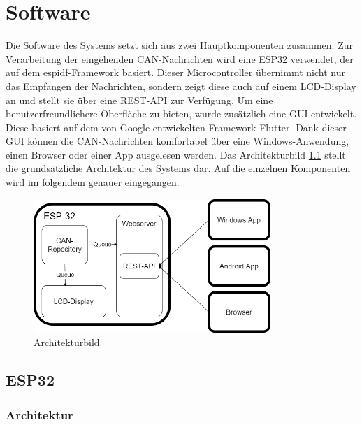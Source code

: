 \chapter{Software}

Die Software des Systems setzt sich aus zwei Hauptkomponenten zusammen. Zur Verarbeitung der eingehenden CAN-Nachrichten wird eine ESP32 verwendet, der auf dem espidf-Framework basiert. Dieser Microcontroller übernimmt nicht nur das Empfangen der Nachrichten, sondern zeigt diese auch auf einem LCD-Display an und stellt sie über eine REST-API zur Verfügung. Um eine benutzerfreundlichere Oberfläche zu bieten, wurde zusätzlich eine GUI entwickelt. Diese basiert auf dem von Google entwickelten Framework Flutter. Dank dieser GUI können die CAN-Nachrichten komfortabel über eine Windows-Anwendung, einen Browser oder einer App ausgelesen werden. Das Architekturbild \ref{fig:architekturbild} stellt die grundsätzliche Architektur des Systems dar. Auf die einzelnen Komponenten wird im folgendem genauer eingegangen.
\begin{figure}[h]
  \centering
  \includegraphics[width=0.8\textwidth]{img/architekturbild.drawio.png}
  \caption{Architekturbild}
  \label{fig:architekturbild}
\end{figure}


\section{ESP32}
\subsection{Architektur}
